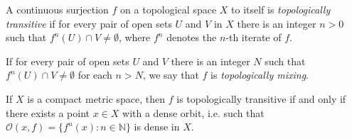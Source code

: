 \documentclass[12pt]{article}
\newcommand{\N}{\mathbb{N}}
\begin{document}
A continuous surjection $f$ on a topological space $X$ to itself 
is \emph{topologically transitive} if for every
pair of open sets $U$ and $V$ in $X$ there is an integer $n>0$ 
such that $f^n(U)\cap V\neq \emptyset$, where $f^n$ denotes the $n$-th iterate of $f$.

If for every pair of open sets $U$ and $V$ there is an integer $N$ such that
$f^n(U)\cap V\neq \emptyset$ for each $n>N$, we say that $f$ is \emph{topologically mixing}.

If $X$ is a compact metric space, then $f$ is topologically transitive if and only if there exists a point $x\in X$ with a dense orbit, i.e. such that $\mathcal{O}(x,f)=\{f^n(x): n\in \N\}$ is dense in $X$.
\end{document}
